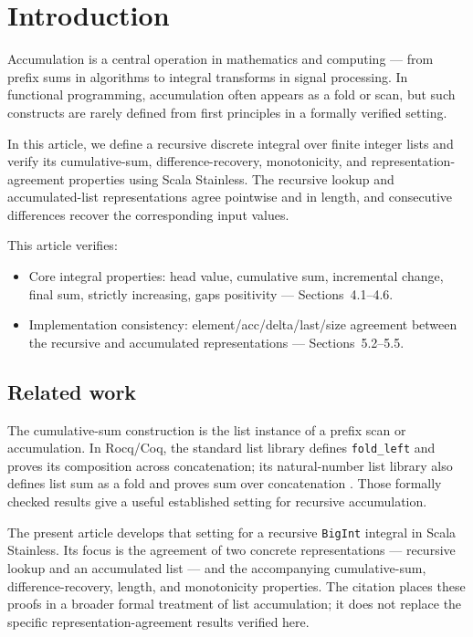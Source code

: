 \section{Introduction}
\label{sec:introduction}

Accumulation is a central operation in mathematics and computing --- from
prefix sums in algorithms to integral transforms in signal processing. In
functional programming, accumulation often appears as a fold or scan, but
such constructs are rarely defined from first principles in a formally
verified setting.

In this article, we define a recursive discrete integral over finite
integer lists and verify its cumulative-sum, difference-recovery,
monotonicity, and representation-agreement properties using Scala
Stainless. The recursive lookup and accumulated-list representations agree
pointwise and in length, and consecutive differences recover the
corresponding input values.

This article verifies:

\begin{itemize}
  \item Core integral properties: head value, cumulative sum, incremental
    change, final sum, strictly increasing, gaps positivity
    --- Sections~4.1--4.6.
  \item Implementation consistency: element/acc/delta/last/size agreement
    between the recursive and accumulated representations
    --- Sections~5.2--5.5.
\end{itemize}

\subsection*{Related work}

The cumulative-sum construction is the list instance of a prefix scan or
accumulation. In Rocq/Coq, the standard list library defines
\texttt{fold\_left} and proves its composition across concatenation; its
natural-number list library also defines list sum as a fold and proves sum
over concatenation \cite{rocqliststdlib}. Those formally checked results
give a useful established setting for recursive accumulation.

The present article develops that setting for a recursive \texttt{BigInt}
integral in Scala Stainless. Its focus is the agreement of two concrete
representations --- recursive lookup and an accumulated list --- and the
accompanying cumulative-sum, difference-recovery, length, and monotonicity
properties. The citation places these proofs in a broader formal treatment
of list accumulation; it does not replace the specific
representation-agreement results verified here.

